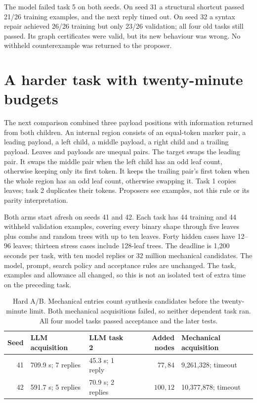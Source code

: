 The model failed task 5 on both seeds. On seed 31 a structural shortcut passed
21/26 training examples, and the next reply timed out. On seed 32 a syntax
repair achieved 26/26 training but only 23/26 validation; all four old tasks
still passed. Its graph certificates were valid, but its new behaviour was
wrong. No withheld counterexample was returned to the proposer.

\section{A harder task with twenty-minute budgets}
\label{sec:hard-ab}

The next comparison combined three payload positions with information returned
from both children. An internal region consists of an equal-token marker pair,
a leading payload, a left child, a middle payload, a right child and a trailing
payload. Leaves and payloads are unequal pairs. The target swaps the leading
pair. It swaps the middle pair when the left child has an odd leaf count,
otherwise keeping only its first token. It keeps the trailing pair's first
token when the whole region has an odd leaf count, otherwise swapping it.
Task 1 copies leaves; task 2 duplicates their tokens. Proposers see examples,
not this rule or its parity interpretation.

Both arms start afresh on seeds 41 and 42. Each task has 44 training and 44
withheld validation examples, covering every binary shape through five leaves
plus combs and random trees with up to ten leaves. Forty hidden cases have 12--96
leaves; thirteen stress cases include 128-leaf trees. The deadline is 1,200
seconds per task, with ten model replies or 32 million mechanical candidates.
The model, prompt, search policy and acceptance rules are unchanged. The task,
examples and allowance all changed, so this is not an isolated test of extra
time on the preceding task.

\begin{table}[htbp]
\centering
\small
\begin{tabular}{rllrl}
\toprule
Seed & LLM acquisition & LLM task 2 & Added nodes & Mechanical acquisition \\
\midrule
41 & 709.9 s; 7 replies & 45.3 s; 1 reply & $77,84$ & 9,261,328; timeout \\
42 & 591.7 s; 5 replies & 70.9 s; 2 replies & $100,12$ & 10,377,878; timeout \\
\bottomrule
\end{tabular}
\caption{Hard A/B. Mechanical entries count synthesis candidates before the
twenty-minute limit. Both mechanical acquisitions failed, so neither dependent
task ran. All four model tasks passed acceptance and the later tests.}
\label{tab:hard-ab}
\end{table}

